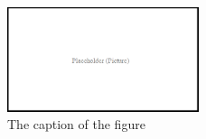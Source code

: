 \documentclass[\main/ExampleThesis]{subfiles}
\begin{document}
\unpacklipsum[141][1] %
\chapter{\lipsumexp}
\lipsum[140][4]

\begin{figure}[h]
  \centering
  \includegraphics[width=0.5\textwidth]{figures/pictures/placeholder}
  \caption{The caption of the figure}
  \label{fig:placeholder4}
\end{figure}

\section{\lipsum[140][3]}
\lipsum[8-9]

\section{\lipsum[140][5]}
\lipsum[10]
\end{document}
